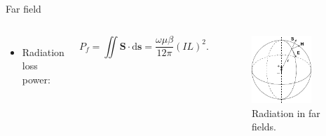 \begin{frame}{Far field}
\begin{columns}
        \vspace{3mm}
        \vspace{-6mm}
        \begin{itemize}
            \item Radiation loss power:
        \end{itemize}
        \begin{equation*}
            P_f = \iint \mathbf{S} \cdot \mathrm{d} \mathbf{s} = \dfrac{\omega \mu \beta}{12\pi} (I L)^2.
        \end{equation*}
        \vspace{-3mm}
        \begin{figure}
            \centering
            \includegraphics[width=0.75\textwidth]{Figures/Spherical_wave.pdf}
            \caption{Radiation in far fields.}
            \label{fig:Spherical_wave}
        \end{figure}
    \end{columns}
\end{frame}